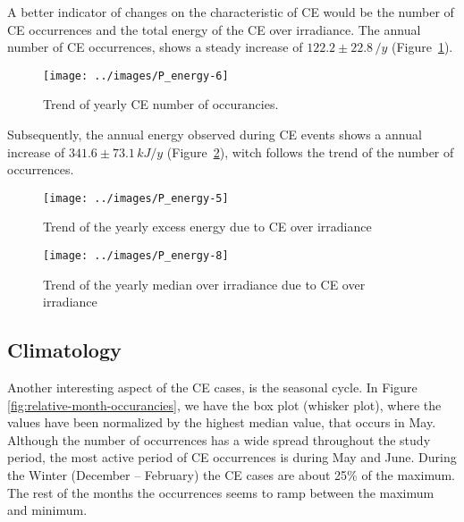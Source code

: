 \documentclass[
]{article}
\begin{document}
A better indicator of changes on the characteristic of CE would be the number of CE
occurrences and the total energy of the CE over irradiance. The annual number of CE
occurrences, shows a steady increase of
\(122.2\pm 22.8\,/y\)
(Figure~\ref{fig:P-energy-N}).

\begin{figure}[h!]

{\centering \texttt{[image: ../images/P\_energy-6]} 

}

\caption{Trend of yearly CE number of occurancies.}\label{fig:P-energy-N}
\end{figure}

Subsequently, the annual energy observed during CE events shows a annual increase of
\(341.6\pm 73.1\,kJ/y\)
(Figure~\ref{fig:P-energy-sum}), witch follows the trend of the number of
occurrences.

\begin{figure}[h!]

{\centering \texttt{[image: ../images/P\_energy-5]} 

}

\caption{Trend of the yearly excess energy due to CE over irradiance}\label{fig:P-energy-sum}
\end{figure}

\begin{figure}[h!]

{\centering \texttt{[image: ../images/P\_energy-8]} 

}

\caption{Trend of the yearly median over irradiance due to CE over irradiance}\label{fig:P-energy-median}
\end{figure}

\FloatBarrier

\hypertarget{climatology}{%
\subsection{Climatology}\label{climatology}}

Another interesting aspect of the CE cases, is the seasonal cycle. In Figure~
\ref{fig:relative-month-occurancies}, we have the box plot (whisker plot), where the
values have been normalized by the highest median value, that occurs in May.
Although the number of occurrences has a wide spread throughout the study period,
the most active period of CE occurrences is during May and June. During the Winter
(December -- February) the CE cases are about 25\% of the maximum. The rest of the
months the occurrences seems to ramp between the maximum and minimum.
\end{document}
